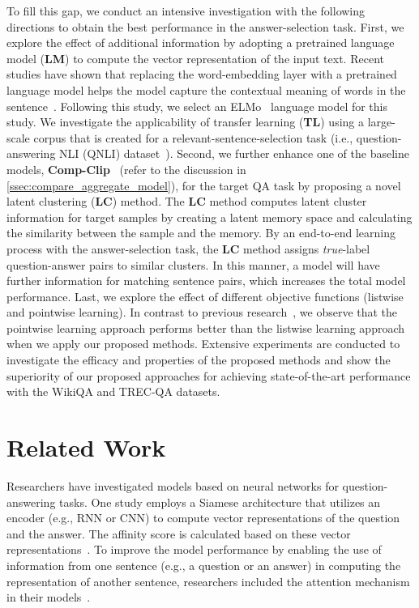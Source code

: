 \documentclass[sigconf]{acmart}
\begin{document}
To fill this gap, we conduct an intensive investigation with the following directions to obtain the best performance in the answer-selection task.
First, we explore the effect of additional information by adopting a pretrained language model (\textbf{LM}) to compute the vector representation of the input text.
Recent studies have shown that replacing the word-embedding layer with a pretrained language model helps the model capture the contextual meaning of words in the sentence~\cite{peters2018deep,devlin2019bert}. Following this study, we select an ELMo~\cite{peters2018deep} language model for this study. 
We investigate the applicability of transfer learning (\textbf{TL}) using a large-scale corpus that is created for a relevant-sentence-selection task (i.e., question-answering NLI (QNLI) dataset~\cite{wang2018glue}).
Second, we further enhance one of the baseline models, \textbf{Comp-Clip}~\cite{bian2017compare} (refer to the discussion in \ref{ssec:compare_aggregate_model}), for the target QA task by proposing a novel latent clustering (\textbf{LC}) method.
The \textbf{LC} method computes latent cluster information for target samples by creating a latent memory space and calculating the similarity between the sample and the memory. By an end-to-end learning process with the answer-selection task, the \textbf{LC} method assigns \textit{true}-label question-answer pairs to similar clusters.
In this manner, a model will have further information for matching sentence pairs, which increases the total model performance.
Last, we explore the effect of different objective functions (listwise and pointwise learning). In contrast to previous research~\cite{bian2017compare}, we observe that the pointwise learning approach performs better than the listwise learning approach when we apply our proposed methods.
Extensive experiments are conducted to investigate the efficacy and properties of the proposed methods and show the superiority of our proposed approaches for achieving state-of-the-art performance with the WikiQA and TREC-QA datasets.



\section{Related Work}
\label{sec:realted_work}
Researchers have investigated models based on neural networks for question-answering tasks. 
One study employs a Siamese architecture that utilizes an encoder (e.g., RNN or CNN) to compute vector representations of the question and the answer. 
The affinity score is calculated based on these vector representations~\cite{lowe2015ubuntu}. To improve the model performance by enabling the use of information from one sentence (e.g., a question or an answer) in computing the representation of another sentence, researchers included the attention mechanism in their models~\cite{tan2015lstm,santos2016attentive,wang2017bilateral}.
\end{document}
